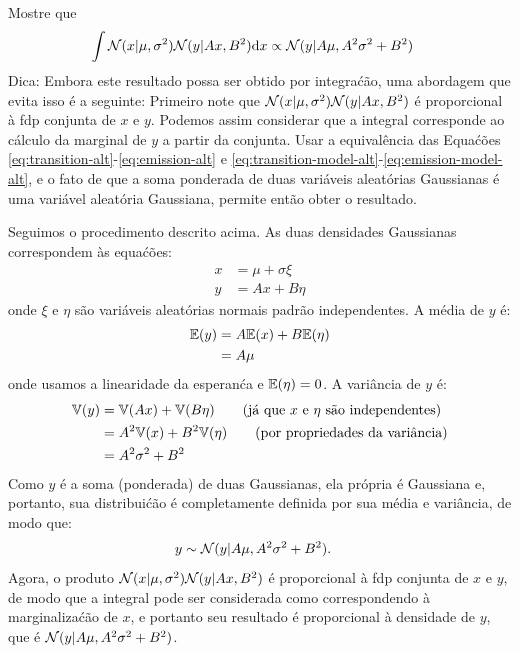 \begin{exenumerate}
\begin{solution}
    \end{solution}
    
    
    \item Mostre que
    \begin{align}
        \int \mathcal{N}(x | \mu, \sigma^2) \mathcal{N}(y | Ax, B^2) \mathrm{d} x & \propto \mathcal{N}(y | A \mu, A^2 \sigma^2 + B^2) \label{eq:Gaussian-int-alt}
    \end{align} 
    Dica: Embora este resultado possa ser obtido por integra\'c\~ao, uma abordagem que evita isso \'e a seguinte: Primeiro note que $\mathcal{N}(x | \mu, \sigma^2) \mathcal{N}(y | Ax, B^2)$ \'e proporcional \`a fdp conjunta de $x$ e $y$. Podemos assim considerar que a integral corresponde ao c\'alculo da marginal de $y$ a partir da conjunta. Usar a equival\^encia das Equa\'c\~oes \eqref{eq:transition-alt}-\eqref{eq:emission-alt} e \eqref{eq:transition-model-alt}-\eqref{eq:emission-model-alt}, e o fato de que a soma ponderada de duas vari\'aveis aleat\'orias Gaussianas \'e uma vari\'avel aleat\'oria Gaussiana, permite ent\~ao obter o resultado.
    \begin{solution}
        Seguimos o procedimento descrito acima. As duas densidades Gaussianas correspondem \`as equa\'c\~oes:
        \begin{align}
            x & = \mu + \sigma \xi\\
            y &= A x + B \eta
        \end{align}
        onde $\xi$ e $\eta$ s\~ao vari\'aveis aleat\'orias normais padr\~ao independentes. A m\'edia de $y$ \'e:
        \begin{align}
            \mathbb{E}(y) & = A \mathbb{E}(x) + B \mathbb{E}(\eta)\\
            & = A \mu
        \end{align}
        onde usamos a linearidade da esperan\'ca e $\mathbb{E}(\eta)=0$. A vari\^ancia de $y$ \'e:
        \begin{align}
            \mathbb{V}(y) & = \mathbb{V}(A x) + \mathbb{V} (B \eta) \quad \quad \text{(j\'a que $x$ e $\eta$ s\~ao independentes)}\\
            & = A^2 \mathbb{V}(x) + B^2 \mathbb{V}(\eta) \quad \quad \text{(por propriedades da vari\^ancia)}\\
            & = A^2 \sigma^2 + B^2
        \end{align}
        Como $y$ \'e a soma (ponderada) de duas Gaussianas, ela pr\'opria \'e Gaussiana
        e, portanto, sua distribui\'c\~ao \'e completamente definida por sua
        m\'edia e vari\^ancia, de modo que:
        \begin{align}
            y & \sim \mathcal{N}(y | A \mu, A^2 \sigma^2+B^2).
        \end{align}
        Agora, o produto $\mathcal{N}(x | \mu, \sigma^2) \mathcal{N}(y | Ax, B^2)$ \'e proporcional \`a fdp conjunta de $x$ e $y$, de modo que a integral pode ser considerada como correspondendo \`a marginaliza\'c\~ao de $x$, e portanto seu resultado \'e proporcional \`a densidade de $y$, que \'e $\mathcal{N}(y | A \mu, A^2 \sigma^2+B^2)$.
    \end{solution}
    

\end{exenumerate}
